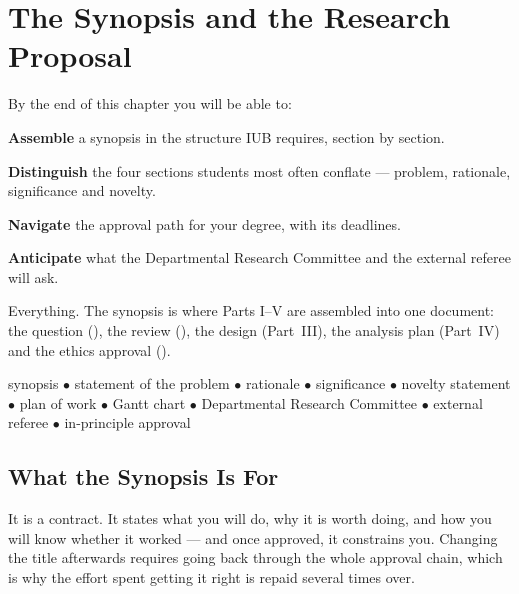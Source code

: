 \chapter{The Synopsis and the Research Proposal}\label{ch:synopsis}

\begin{outcomes}
By the end of this chapter you will be able to:
\begin{tight}
  \item \textbf{Assemble} a synopsis in the structure IUB requires, section by
    section.
  \item \textbf{Distinguish} the four sections students most often conflate ---
    problem, rationale, significance and novelty.
  \item \textbf{Navigate} the approval path for your degree, with its
    deadlines.
  \item \textbf{Anticipate} what the Departmental Research Committee and the
    external referee will ask.
\end{tight}
\end{outcomes}

\begin{prereq}
Everything. The synopsis is where Parts I--V are assembled into one document:
the question (), the review (), the design
(Part~III), the analysis plan (Part~IV) and the ethics approval
().
\end{prereq}

\begin{keyterms}
synopsis $\bullet$ statement of the problem $\bullet$ rationale $\bullet$
significance $\bullet$ novelty statement $\bullet$ plan of work $\bullet$ Gantt
chart $\bullet$ Departmental Research Committee $\bullet$ external referee
$\bullet$ in-principle approval
\end{keyterms}

\section{What the Synopsis Is For}

It is a contract. It states what you will do, why it is worth doing, and how
you will know whether it worked --- and once approved, it constrains you.
Changing the title afterwards requires going back through the whole approval
chain, which is why the effort spent getting it right is repaid several times
over.

